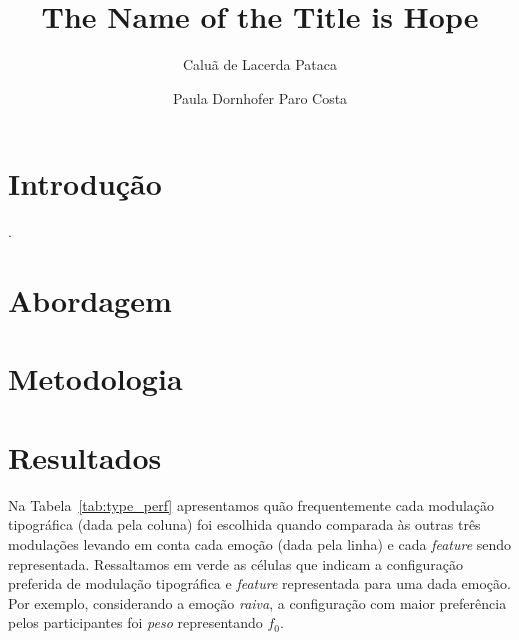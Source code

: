 \documentclass[11pt]{article}
\title{The Name of the Title is Hope}
\author{Caluã de Lacerda Pataca \and Paula Dornhofer Paro Costa}
\begin{document}
\hyphenation{}
\pagestyle{fancy}


  \section{Introdu\c{c}\~{a}o}
  \label{sec:introducao}

   .

  \section{Abordagem}
  \label{sec:abordagem}
  
  
  \section{Metodologia}
  \label{sec:metodologia}
  
  


\section{Resultados}
  \label{sec:resultados}
  
  Na Tabela~\ref{tab:type_perf} apresentamos quão frequentemente cada modulação tipográfica (dada pela coluna) foi escolhida quando comparada às outras três modulações levando em conta cada emoção (dada pela linha) e cada {\itshape feature} sendo representada. Ressaltamos em verde as células que indicam a configuração preferida de modulação tipográfica e {\itshape feature} representada para uma dada emoção. Por exemplo, considerando a emoção {\itshape raiva}, a configuração com maior preferência pelos participantes foi {\itshape peso} representando $f_0$.
  
\end{document}
